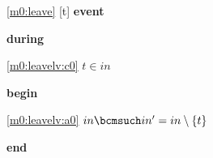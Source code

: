 \noindent \ref{m0:leave} [t] \textbf{event}
\begin{block}
  \item   \textbf{during}
  \begin{block}
  \item[ \eqref{m0:leavelv:c0} ]$t \in in $ %
  \end{block}
  \item   \textbf{begin}
  \begin{block}
  \item[ \eqref{m0:leavelv:a0} ]$in \bcmsuch in' = in \setminus \{ t \} $ %
  \end{block}
  \item   \textbf{end} \\
\end{block}
